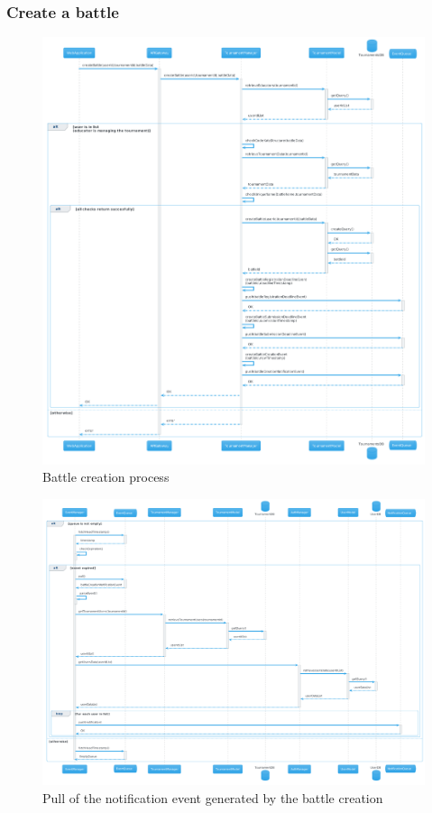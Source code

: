 \subsubsection{Create a battle}
\begin{figure}[H]
    \hspace{-0.7cm}
    \includegraphics[width=1.1\textwidth]{Diagrams/sequence/create_battle.png}
    \caption{Battle creation process}
\end{figure}
\begin{figure}[H]
    \hspace{-1.5cm}
    \includegraphics[width=1.2\textwidth]{Diagrams/sequence/create_battle_pull_notification.png}
    \caption{Pull of the notification event generated by the battle creation}
\end{figure}
